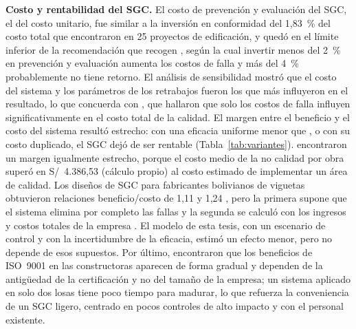 \textbf{Costo y rentabilidad del SGC.} El costo de prevención y evaluación del SGC, el \CCconDetPct{} del costo unitario, fue similar a la inversión en conformidad del 1,83~\% del costo total que \textcite[p.~5420]{khadim2023} encontraron en 25 proyectos de edificación, y quedó en el límite inferior de la recomendación que recogen \textcite[sección~2.2.1]{palanisamy2025}, según la cual invertir menos del 2~\% en prevención y evaluación aumenta los costos de falla y más del 4~\% probablemente no tiene retorno. El análisis de sensibilidad mostró que el costo del sistema y los parámetros de los retrabajos fueron los que más influyeron en el resultado, lo que concuerda con \textcite[sección~3.3]{palanisamy2025}, que hallaron que solo los costos de falla influyen significativamente en el costo total de la calidad. El margen entre el beneficio y el costo del sistema resultó estrecho: con una eficacia uniforme menor que \KequilibrioCero{}, o con su costo duplicado, el SGC dejó de ser rentable (Tabla~\ref{tab:variantes}). \textcite[p.~95]{gudiel2020} encontraron un margen igualmente estrecho, porque el costo medio de la no calidad por obra superó en S/~4.386,53 (cálculo propio) al costo estimado de implementar un área de calidad. Los diseños de SGC para fabricantes bolivianos de viguetas obtuvieron relaciones beneficio/costo de 1,11 y 1,24 \parencites[p.~117]{mamanicalsina2025}[p.~174]{pena2024}, pero la primera supone que el sistema elimina por completo las fallas \parencite[p.~110]{mamanicalsina2025} y la segunda se calculó con los ingresos y costos totales de la empresa \parencite[pp.~173--175]{pena2024}. El modelo de esta tesis, con un escenario de control y con la incertidumbre de la eficacia, estimó un efecto menor, pero no depende de esos supuestos. Por último, \textcite[pp.~161--162, 164]{pradoroman2018} encontraron que los beneficios de ISO~9001 en las constructoras aparecen de forma gradual y dependen de la antigüedad de la certificación y no del tamaño de la empresa; un sistema aplicado en solo dos losas tiene poco tiempo para madurar, lo que refuerza la conveniencia de un SGC ligero, centrado en pocos controles de alto impacto y con el personal existente.

